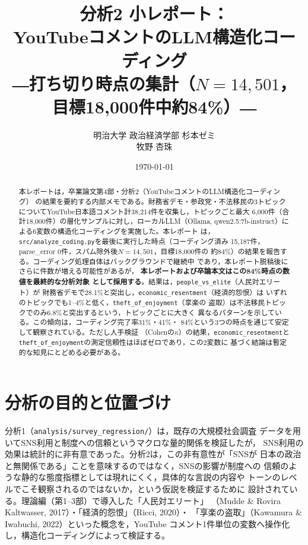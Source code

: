 \documentclass[dvipdfmx, a4paper, 11pt]{jsarticle}
\title{分析2 小レポート：\\YouTubeコメントのLLM構造化コーディング\\ \large{―打ち切り時点の集計（$N=14{,}501$，目標18,000件中約84\%）―}}
\author{明治大学 政治経済学部 杉本ゼミ\\ 牧野 杏珠}
\date{\today}
\begin{document}
\maketitle

\begin{abstract}
本レポートは，卒業論文第4部・分析2（YouTubeコメントのLLM構造化コーディング）
の結果を要約する内部メモである。財務省デモ・参政党・不法移民の3トピック
についてYouTube日本語コメント計38{,}214件を収集し，トピックごと最大
6{,}000件（合計18{,}000件）の層化サンプルに対し，ローカルLLM（Ollama,
qwen2.5:7b-instruct）による6変数の構造化コーディングを実施した。本レポート
は，\texttt{src/analyze\_coding.py}を最後に実行した時点（コーディング済み
15{,}187件，parse\_error 0件，スパム除外後$N=14{,}501$，目標18{,}000件の
約84\%）の結果を報告する。コーディング処理自体はバックグラウンドで継続中
であり，本レポート脱稿後にさらに件数が増える可能性があるが，
\textbf{本レポートおよび卒論本文はこの84\%時点の数値を最終的な分析対象
として採用する}。結果は，\texttt{people\_vs\_elite}（人民対エリート）が
財務省デモで28.1\%と突出し，\texttt{economic\_resentment}（経済的怨恨）は
いずれのトピックでも1--4\%と低く，\texttt{theft\_of\_enjoyment}（享楽の
盗取）は不法移民トピックでのみ6.8\%と突出するという，トピックごとに大きく
異なるパターンを示している。この傾向は，コーディング完了率31\%・41\%・
84\%という3つの時点を通じて安定して観察されている。ただし人手検証
（Cohenの$\kappa$）の結果，\texttt{economic\_resentment}と
\texttt{theft\_of\_enjoyment}の測定信頼性はほぼゼロであり，この2変数に
基づく結論は暫定的な知見にとどめる必要がある。
\end{abstract}

\section{分析の目的と位置づけ}
分析1（\texttt{analysis/survey\_regression/}）は，既存の大規模社会調査
データを用いてSNS利用と制度への信頼というマクロな量的関係を検証したが，
SNS利用の効果は統計的に非有意であった。分析2は，この非有意性が「SNSが
日本の政治と無関係である」ことを意味するのではなく，SNSの影響が制度への
信頼のような静的な態度指標としては現れにくく，具体的な言説の内容や
トーンのレベルでこそ観察されるのではないか，という仮説を検証するために
設計されている。理論編（第1--3部）で導入した「人民対エリート」
（Mudde \& Rovira Kaltwasser, 2017）・「経済的怨恨」（Ricci, 2020）・
「享楽の盗取」（Kawamura \& Iwabuchi, 2022）といった概念を，YouTube
コメント1件単位の変数へ操作化し，構造化コーディングによって検証する。
\end{document}
